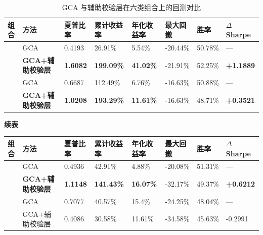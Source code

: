 \begin{table}[H]
\centering
\caption{GCA 与辅助校验层在六类组合上的回测对比}
\label{tab:qr_gca_results}
\footnotesize
\setlength{\tabcolsep}{2pt}
\renewcommand{\arraystretch}{1.15}
\begin{tabular}{@{}p{}p{}p{}p{}p{}p{}p{}p{}@{}}
\toprule
\textbf{组合} & \textbf{方法} & \textbf{夏普比率} & \textbf{累计收益率} & \textbf{年化收益率} & \textbf{最大回撤} & \textbf{胜率} & \textbf{$\Delta$ Sharpe} \\
\midrule
{}
& GCA & 0.4193 & 26.91\% & 5.54\% & -20.44\% & 50.78\% & --- \\
& \textbf{GCA+辅助校验层} & \textbf{1.6082} & \textbf{199.09\%} & \textbf{41.02\%} & -21.91\% & 52.25\% & \textbf{+1.1889} \\
\midrule
{}
& GCA & 0.6687 & 112.49\% & 6.76\% & -16.63\% & 50.88\% & --- \\
& \textbf{GCA+辅助校验层} & \textbf{1.0208} & \textbf{193.29\%} & \textbf{11.61\%} & -16.63\% & 48.71\% & \textbf{+0.3521} \\
\bottomrule
\end{tabular}
\end{table}
\begin{table}[H]
\centering
{\small\textbf{续表}}\\[0.5em]
\footnotesize
\setlength{\tabcolsep}{2pt}
\renewcommand{\arraystretch}{1.15}
\begin{tabular}{@{}p{}p{}p{}p{}p{}p{}p{}p{}@{}}
\toprule
\textbf{组合} & \textbf{方法} & \textbf{夏普比率} & \textbf{累计收益率} & \textbf{年化收益率} & \textbf{最大回撤} & \textbf{胜率} & \textbf{$\Delta$ Sharpe} \\
\midrule
{}
& GCA & 0.4936 & 42.91\% & 4.88\% & -20.08\% & 51.31\% & --- \\
& \textbf{GCA+辅助校验层} & \textbf{1.1148} & \textbf{141.43\%} & \textbf{16.07\%} & -32.17\% & 49.37\% & \textbf{+0.6212} \\
\midrule
{}
& GCA & 0.7077 & 40.57\% & 15.4\% & -24.25\% & 48.04\% & --- \\
& GCA+辅助校验层 & 0.4086 & 30.58\% & 11.61\% & -34.58\% & 45.63\% & -0.2991 \\
\bottomrule
\end{tabular}
\end{table}

